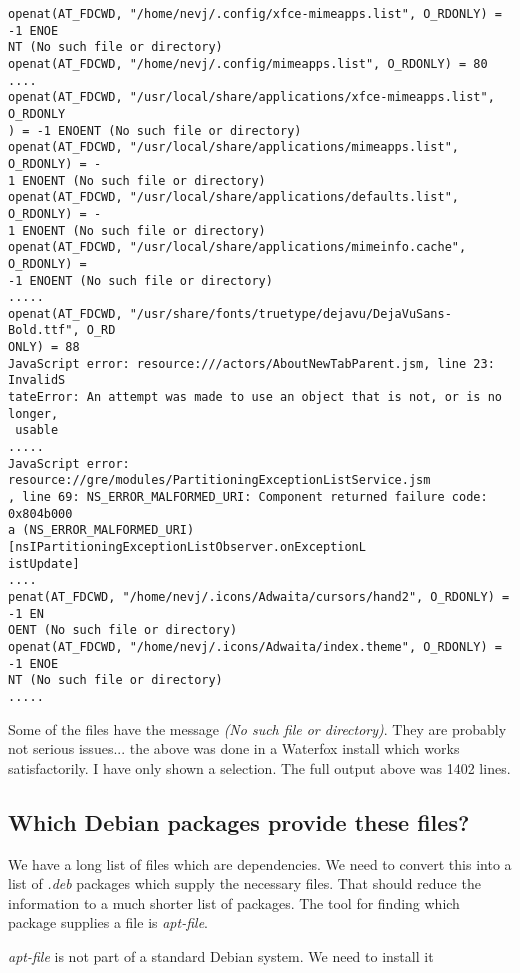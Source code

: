 \documentclass{article}  %
\begin{document}
\begin{verbatim}
openat(AT_FDCWD, "/home/nevj/.config/xfce-mimeapps.list", O_RDONLY) = -1 ENOE
NT (No such file or directory)
openat(AT_FDCWD, "/home/nevj/.config/mimeapps.list", O_RDONLY) = 80
....
openat(AT_FDCWD, "/usr/local/share/applications/xfce-mimeapps.list", O_RDONLY
) = -1 ENOENT (No such file or directory)
openat(AT_FDCWD, "/usr/local/share/applications/mimeapps.list", O_RDONLY) = -
1 ENOENT (No such file or directory)
openat(AT_FDCWD, "/usr/local/share/applications/defaults.list", O_RDONLY) = -
1 ENOENT (No such file or directory)
openat(AT_FDCWD, "/usr/local/share/applications/mimeinfo.cache", O_RDONLY) = 
-1 ENOENT (No such file or directory)
.....
openat(AT_FDCWD, "/usr/share/fonts/truetype/dejavu/DejaVuSans-Bold.ttf", O_RD
ONLY) = 88
JavaScript error: resource:///actors/AboutNewTabParent.jsm, line 23: InvalidS
tateError: An attempt was made to use an object that is not, or is no longer,
 usable
.....
JavaScript error: resource://gre/modules/PartitioningExceptionListService.jsm
, line 69: NS_ERROR_MALFORMED_URI: Component returned failure code: 0x804b000
a (NS_ERROR_MALFORMED_URI) [nsIPartitioningExceptionListObserver.onExceptionL
istUpdate]
....
penat(AT_FDCWD, "/home/nevj/.icons/Adwaita/cursors/hand2", O_RDONLY) = -1 EN
OENT (No such file or directory)
openat(AT_FDCWD, "/home/nevj/.icons/Adwaita/index.theme", O_RDONLY) = -1 ENOE
NT (No such file or directory)
.....
\end{verbatim}
 Some of the files have the message {\em (No such file or directory)}. They are probably not serious issues... the above was done in a Waterfox install which works satisfactorily. I have only shown a selection. The full output above was 1402 lines. 


\subsection{Which Debian packages provide these files?}
We have a long list of files which are dependencies. We need to convert this into a list of {\em .deb} packages which supply the necessary files.  That should reduce the information to a much shorter list of packages. The tool for finding which package supplies a file is {\em apt-file}.

{\em apt-file} is not part of a standard Debian system. We need to install it
\end{document}
